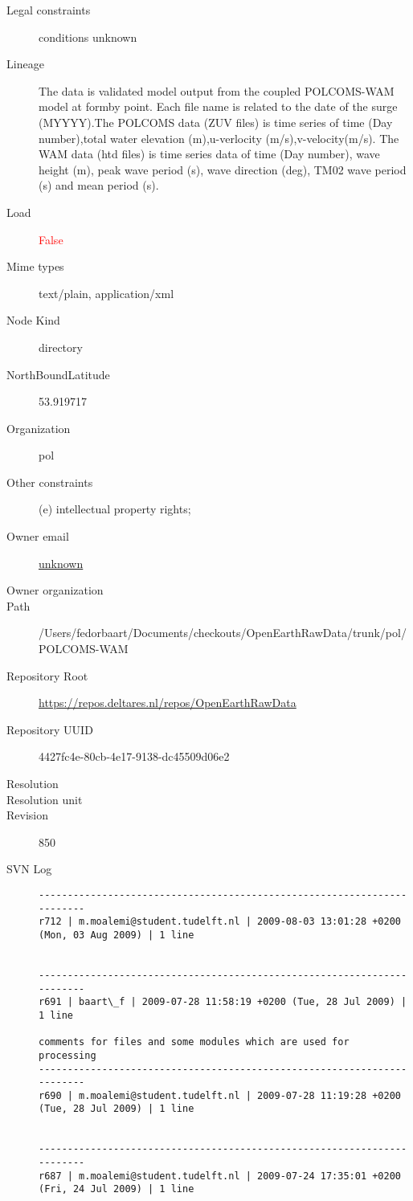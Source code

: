 \documentclass[9]{report}
\begin{document}
\begin{description}
  \item[Legal constraints] conditions unknown
  \item[Lineage] The data is validated model output from the coupled POLCOMS-WAM model at formby point. Each file name is related to the date of the surge (MYYYY).The POLCOMS data (ZUV files) is time series of time (Day number),total water elevation (m),u-verlocity (m/s),v-velocity(m/s). The WAM data (htd files) is time series data of time (Day number), wave height (m), peak wave period (s), wave direction (deg), TM02 wave period (s) and mean period (s).
  \item[Load] \textcolor{red}{False}
  \item[Mime types] text/plain, application/xml
  \item[Node Kind] directory
  \item[NorthBoundLatitude] 53.919717
  \item[Organization] pol
  \item[Other constraints] (e) intellectual property rights;
  \item[Owner email] \href{mailto:unknown}{unknown}
  \item[Owner organization] 
  \item[Path] /Users/fedorbaart/Documents/checkouts/OpenEarthRawData/trunk/pol/POLCOMS-WAM
  \item[Repository Root] \href{https://repos.deltares.nl/repos/OpenEarthRawData}{https://repos.deltares.nl/repos/OpenEarthRawData}
  \item[Repository UUID] 4427fc4e-80cb-4e17-9138-dc45509d06e2
  \item[Resolution] 
  \item[Resolution unit] 
  \item[Revision] 850
  \item[SVN Log] \begin{verbatim}
------------------------------------------------------------------------
r712 | m.moalemi@student.tudelft.nl | 2009-08-03 13:01:28 +0200 (Mon, 03 Aug 2009) | 1 line


------------------------------------------------------------------------
r691 | baart\_f | 2009-07-28 11:58:19 +0200 (Tue, 28 Jul 2009) | 1 line

comments for files and some modules which are used for processing
------------------------------------------------------------------------
r690 | m.moalemi@student.tudelft.nl | 2009-07-28 11:19:28 +0200 (Tue, 28 Jul 2009) | 1 line


------------------------------------------------------------------------
r687 | m.moalemi@student.tudelft.nl | 2009-07-24 17:35:01 +0200 (Fri, 24 Jul 2009) | 1 line


\end{verbatim}
\end{description}
\end{document}
